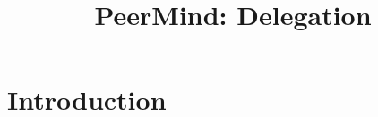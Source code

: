 \documentclass{sigchi}
\def\plaintitle{PeerMind: Delegation}
\begin{document}
\title{\plaintitle}


\maketitle

\begin{abstract}


\end{abstract}

%

\section{Introduction}
\end{document}
